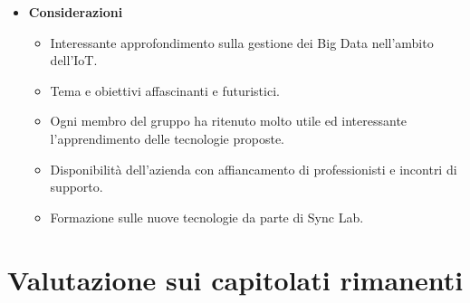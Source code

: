 \documentclass{article}
\begin{document}
\begin{itemize}
    \item[] \textbf{Considerazioni}
    \vspace{-0.2cm}
    \begin{itemize}
        \item Interessante approfondimento sulla gestione dei Big Data nell’ambito dell’IoT. 
        \item Tema e obiettivi affascinanti e futuristici. 
        \item Ogni membro del gruppo ha ritenuto molto utile ed interessante l’apprendimento delle tecnologie proposte. 
        \item Disponibilità dell’azienda con affiancamento di professionisti e incontri di supporto. 
        \item Formazione sulle nuove tecnologie da parte di Sync Lab. 
    \end{itemize} 

\end{itemize}
    
\vspace{2cm}

\section{Valutazione sui capitolati rimanenti}

\end{document}
